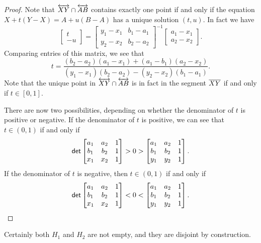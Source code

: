 \begin{proof}
Note that $\overleftrightarrow{XY} \cap \overleftrightarrow{AB}$ contains exactly one point if and only if the equation $X + t(Y-X) = A + u(B-A)$ has a unique solution $(t,u)$. In fact we have \[ \begin{bmatrix} t \\ -u \end{bmatrix} = \begin{bmatrix} y_1 - x_1 & b_1 - a_1 \\ y_2 - x_2 & b_2 - a_2 \end{bmatrix}^{-1} \begin{bmatrix} a_1 - x_1 \\ a_2 - x_2 \end{bmatrix}. \] Comparing entries of this matrix, we see that \[ t = \frac{(b_2-a_2)(a_1-x_1) + (a_1-b_1)(a_2-x_2)}{(y_1-x_1)(b_2-a_2) - (y_2-x_2)(b_1-a_1)}. \] Note that the unique point in $\overleftrightarrow{XY} \cap \overleftrightarrow{AB}$ is in fact in the segment $\overline{XY}$ if and only if $t \in [0,1]$.

There are now two possibilities, depending on whether the denominator of $t$ is positive or negative. If the denominator of $t$ is positive, we can see that $t \in (0,1)$ if and only if \[ \mathsf{det} \begin{bmatrix} a_1 & a_2 & 1 \\ b_1 & b_2 & 1 \\ x_1 & x_2 & 1 \end{bmatrix} > 0 > \begin{bmatrix} a_1 & a_2 & 1 \\ b_1 & b_2 & 1 \\ y_1 & y_2 & 1 \end{bmatrix}. \] If the denominator of $t$ is negative, then $t \in (0,1)$ if and only if \[ \mathsf{det} \begin{bmatrix} a_1 & a_2 & 1 \\ b_1 & b_2 & 1 \\ x_1 & x_2 & 1 \end{bmatrix} < 0 < \begin{bmatrix} a_1 & a_2 & 1 \\ b_1 & b_2 & 1 \\ y_1 & y_2 & 1 \end{bmatrix}. \qedhere \]
\end{proof}

Certainly both $H_1$ and $H_2$ are not empty, and they are disjoint by construction.

